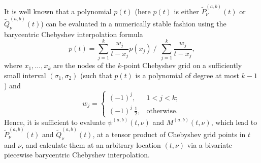 \documentclass[11pt]{article}
\begin{document}
It is well known that a polynomial $p(t)$ (here $p(t)$ is either $\tilde{P}_\nu^{(a,b)}(t)$ or $\tilde{Q}_\nu^{(a,b)}(t)$) can be evaluated in a numerically stable fashion
using the barycentric Chebyshev interpolation formula \cite{Trefethen}
\begin{equation}
p(t) = \sum_{j=1}^{k}  \frac{w_j}{t-x_j} p(x_j)
\ \bigg / \ \ 
\sum_{j=1}^{k}  \frac{w_j}{t-x_j},
\label{cheby:bary}
\end{equation}
where $x_1,\ldots,x_k$ are the nodes of the $k$-point Chebyshev grid
on a sufficiently small interval $(\sigma_1,\sigma_2)$ (such that $p(t)$ is a polynomial of degree at most $k-1$) and 
\begin{equation}
w_j = \begin{cases}
(-1)^j,  & 1 < j < k; \\
(-1)^j\  \frac{1}{2}, & \mbox{otherwise}.
\end{cases}
\end{equation}
Hence, it is sufficient to evaluate $\psi^{(a,b)}(t,\nu)$ and $M^{(a,b)}(t,\nu)$, which lead to $\tilde{P}_\nu^{(a,b)}(t)$ and $\tilde{Q}_\nu^{(a,b)}(t)$, at a tensor product of Chebyshev grid points in $t$ and $\nu$, and calculate them at an arbitrary location $(t,\nu)$ via a bivariate piecewise barycentric Chebyshev interpolation. 
\end{document}
